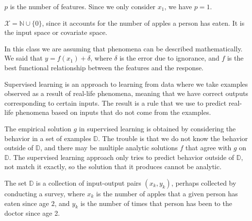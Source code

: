 \documentclass[12pt]{article}
\begin{document}
\begin{enumerate}

$p$ is the number of features. Since we only consider $x_1$, we have $p=1$.


$\mathcal{X}=\mathbb{N}\cup\{0\}$, since it accounts for the number of apples a person
has eaten. It is the input space or covariate space.


In this class we are assuming that phenomena can be described mathematically. We said
that $y=f(x_1) + \delta$, where $\delta$ is the error due to ignorance, and $f$ is the
best functional relationship between the features and the response.


Supervised learning is an approach to learning from data where we take examples observed as
a result of real-life phenomena, meaning that we have correct outputs corresponding to
certain inputs. The result is a rule that we use to predict real-life phenomena based on
inputs that do not come from the examples.


The empirical solution $g$ in supervised learning is obtained by considering the
behavior in a set of examples $\mathbb{D}$. The trouble is that we do not know
the behavior outside of $\mathbb{D}$, and there may be multiple analytic solutions
$f$ that agree with $g$ on $\mathbb{D}$. The supervised learning approach only tries
to predict behavior outside of $\mathbb{D}$, not match it exactly, so the solution
that it produces cannot be analytic.


The set $\mathbb{D}$ is a collection of input-output pairs $(x_k,y_k)$, perhaps collected
by conducting a survey, where $x_k$ is the number of apples that a given person has eaten
since age $2$, and $y_k$ is the number of times that person has been to the doctor since age 2.


\end{enumerate}
\end{document}
